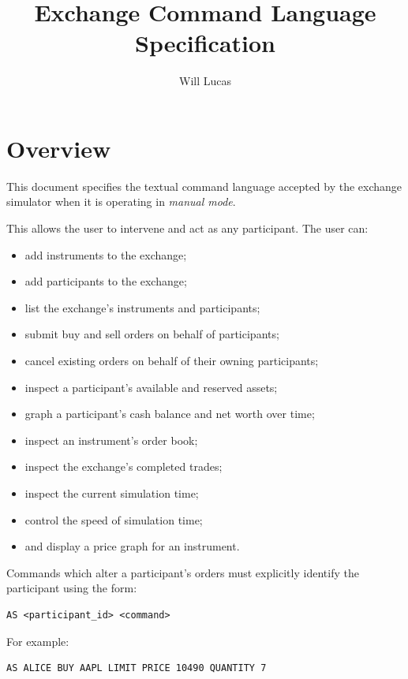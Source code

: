 \documentclass{article}
\title{Exchange Command Language Specification}
\author{Will Lucas}
\date{}
\begin{document}
\maketitle
\tableofcontents

\section{Overview}

This document specifies the textual command language accepted by the
exchange simulator when it is operating in \textit{manual mode}.

This allows the user to intervene and act as any participant. The user can:

\begin{itemize}
    \item add instruments to the exchange;
    \item add participants to the exchange;
    \item list the exchange's instruments and participants;
    \item submit buy and sell orders on behalf of participants;
    \item cancel existing orders on behalf of their owning participants;
    \item inspect a participant's available and reserved assets;
    \item graph a participant's cash balance and net worth over time;
    \item inspect an instrument's order book;
    \item inspect the exchange's completed trades;
    \item inspect the current simulation time;
    \item control the speed of simulation time;
    \item and display a price graph for an instrument.
\end{itemize}

Commands which alter a participant's orders must explicitly identify the
participant using the form:

\begin{lstlisting}
AS <participant_id> <command>
\end{lstlisting}

For example:

\begin{lstlisting}
AS ALICE BUY AAPL LIMIT PRICE 10490 QUANTITY 7
\end{lstlisting}
\end{document}
